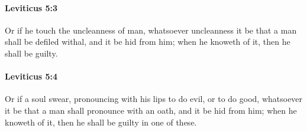 		\paragraph{Leviticus 5:3} %
			\label{LEVITICUS-5-3}

			Or if he touch the uncleanness of man, whatsoever uncleanness it be that a man shall be defiled withal, and it be hid from him; when he knoweth of it, then he shall be guilty.


		\paragraph{Leviticus 5:4} %
			\label{LEVITICUS-5-4}

			Or if a soul swear, pronouncing with his lips to do evil, or to do good, whatsoever it be that a man shall pronounce with an oath, and it be hid from him; when he knoweth of it, then he shall be guilty in one of these.

